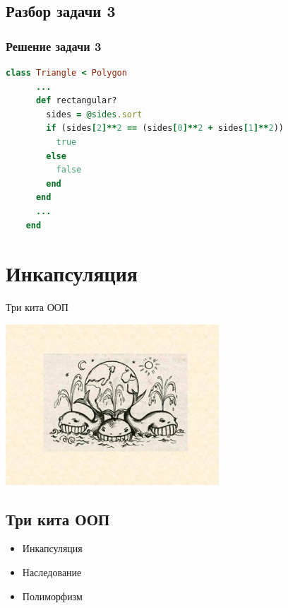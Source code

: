 \documentclass[compress,red]{beamer}
\begin{document}
\subsection{Разбор задачи 3}
\begin{frame}[fragile]
  \frametitle{Решение задачи 3}
  \scriptsize{
  \begin{lstlisting}[language=ruby,basicstyle=\footnotesize,label=ruby3,caption=Задача 3]
    class Triangle < Polygon
      ...
      def rectangular?
        sides = @sides.sort
        if (sides[2]**2 == (sides[0]**2 + sides[1]**2))
          true
        else
          false
        end
      end
      ...
    end
  \end{lstlisting}
  }
  
\end{frame}

\section{Инкапсуляция}
\begin{frame}
  \begin{center}
    \Huge{Три кита ООП}
    \centerline{\includegraphics[width=0.6\textwidth]{images/3whales.jpg}}
  \end{center}
\end{frame}

\subsection{Три кита ООП}
\begin{frame}
  \begin{center}
    \begin{itemize}
      \item \Huge{Инкапсуляция}
      \item \Huge{Наследование}
      \item \Huge{Полиморфизм}
    \end{itemize}
  \end{center}
\end{frame}
\end{document}
